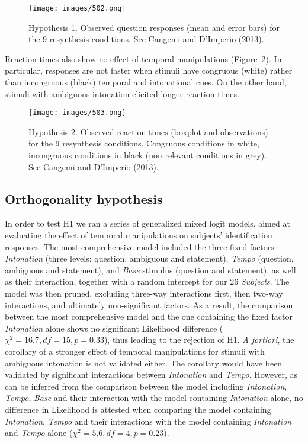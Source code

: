 \begin{figure}[p]
\centering
\texttt{[image: images/502.png]}
\caption{Hypothesis 1. Observed question responses (mean and error bars) for the 9 resynthesis conditions. See Cangemi and D'Imperio (2013).}
\label{fig502}\end{figure}

Reaction times also show no effect of temporal manipulations (Figure~\ref{fig503}). In particular, responses are not faster when stimuli have congruous (white) rather than incongruous (black) temporal and intonational cues. 
\enlargethispage{1em}
On the other hand, stimuli with ambiguous intonation elicited longer reaction times.

\begin{figure}[p]
\centering
\texttt{[image: images/503.png]}
\caption{Hypothesis 2. Observed reaction times (boxplot and observations) for the 9 resynthesis conditions. Congruous conditions in white, incongruous conditions in black (non relevant conditions in grey). See Cangemi and D'Imperio (2013).}
\label{fig503}\end{figure}

\subsection{Orthogonality hypothesis}\label{sec531}
In order to test H1 we ran a series of generalized mixed logit models, aimed at evaluating the effect of temporal manipulations on subjects' identification responses. The most comprehensive model included the three fixed factors \textit{Intonation} (three levels: question, ambiguous and statement), \textit{Tempo} (question, ambiguous and statement), and \textit{Base} stimulus (question and statement), as well as their interaction, together with a random intercept for our 26 \textit{Subjects}. The model was then pruned, excluding three-way interactions first, then two-way interactions, and ultimately non-significant factors. As a result, the comparison between the most comprehensive model and the one containing the fixed factor \textit{Intonation} alone shows no significant Likelihood difference ($\chi^{2}=16.7, df=15, p=0.33$), 
\enlargethispage{1em}
thus leading to the rejection of H1.
\textit{A fortiori}, the corollary of a stronger effect of temporal manipulations for stimuli with ambiguous intonation is not validated either. The corollary would have been validated by significant interactions between \textit{Intonation} and \textit{Tempo}. However, as can be inferred from the comparison between the model including \textit{Intonation}, \textit{Tempo}, \textit{Base} and their interaction with the model containing \textit{Intonation} alone, no difference in Likelihood is attested when comparing the model containing \textit{Intonation}, \textit{Tempo} and their interactions with the model containing \textit{Intonation} and \textit{Tempo} alone ($\chi^{2}=5.6, df=4, p=0.23$).
